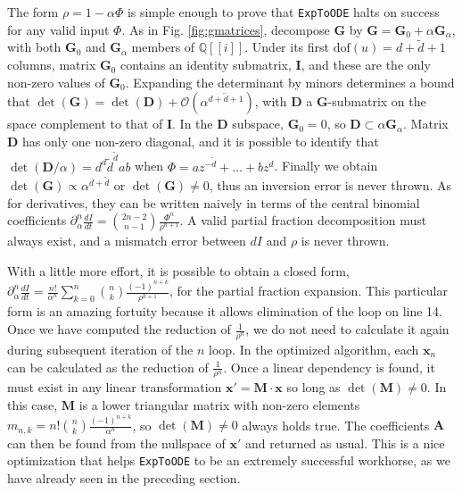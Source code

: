 \documentclass[nofootinbib,preprint]{revtex4-1}
\begin{document}
The form $\rho = 1-\alpha \Phi$ is simple enough to prove that \texttt{ExpToODE} halts
on success for any valid input $\Phi$. As in Fig. \ref{fig:gmatrices}, decompose $\mathbf{G}$ by 
$\mathbf{G}=\mathbf{G}_0+\alpha\mathbf{G}_{\alpha}$, with both $\mathbf{G}_{0}$ and
$\mathbf{G}_{\alpha}$ members of $\mathbb{Q}[\![i]\!]$. Under its first 
$\text{dof}(u)=d+\tilde{d}+1$ columns, matrix $\mathbf{G}_{0}$ contains an
identity submatrix, $\mathbf{I}$, and these are the only non-zero values of $\mathbf{G}_{0}$. 
Expanding the determinant by minors determines a bound that 
$\det(\mathbf{G})=\det(\mathbf{D})+\mathcal{O}(\alpha^{d+\tilde{d}+1})$, 
with $\mathbf{D}$ a $\mathbf{G}$-submatrix on the space complement to
that of $\mathbf{I}$. In the $\mathbf{D}$ subspace, $\mathbf{G}_{0}=0$, so 
$\mathbf{D} \subset \alpha \mathbf{G}_{\alpha}$. Matrix $\mathbf{D}$
has only one non-zero diagonal, and it is possible to identify that 
$\det(\mathbf{D}/\alpha)=d^d \tilde{d}^{\tilde{d}} a b$
when $\Phi = a z^{-\tilde{d}} + \ldots + b z^d$. Finally we obtain 
$\det(\mathbf{G})\propto \alpha^{d+\tilde{d}}$ or $\det(\mathbf{G})\neq 0$,
thus an inversion error is never thrown. As for derivatives, they can be written 
naively in terms of the central binomial coefficients 
$\partial_{\alpha}^n\frac{dI}{dt}=\binom{2n-2}{n-1}\frac{\Phi^n}{\rho^{n+1}}$. 
A valid partial fraction decomposition must always exist, and a mismatch error between 
$dI$ and $\rho$ is never thrown. 

With a little more effort, it is possible to obtain a closed form,
$\partial_{\alpha}^n\frac{dI}{dt}=\frac{n!}{\alpha^n}\sum_{k=0}^n\binom{n}{k}\frac{(-1)^{n+k}}{\rho^{k+1}}$,
for the partial fraction expansion. This particular form is an amazing fortuity because it allows 
elimination of the loop on line 14. Once we have computed the reduction of $\frac{1}{\rho^{n}}$, 
we do not need to calculate it again during subsequent iteration of the $n$ loop. In the optimized
algorithm, each $\mathbf{x}_n$ can be calculated as the reduction of $\frac{1}{\rho^n}$. Once a 
linear dependency is found, it must exist in any linear transformation $\mathbf{x}'=\mathbf{M}\cdot \mathbf{x} $
so long as $\det(\mathbf{M}) \neq 0$. In this case, $\mathbf{M}$ is a lower triangular matrix
with non-zero elements $m_{n,k}=n!\binom{n}{k}\frac{(-1)^{n+k}}{\alpha^n}$, so $\det(\mathbf{M})\neq0$
always holds true. The coefficients $\mathbf{A}$ can then be found from the nullspace of 
$\mathbf{x}'$ and returned as usual. This is a nice optimization that helps \texttt{ExpToODE} 
to be an extremely successful workhorse, as we have already seen in the preceding section.
 
\end{document}
